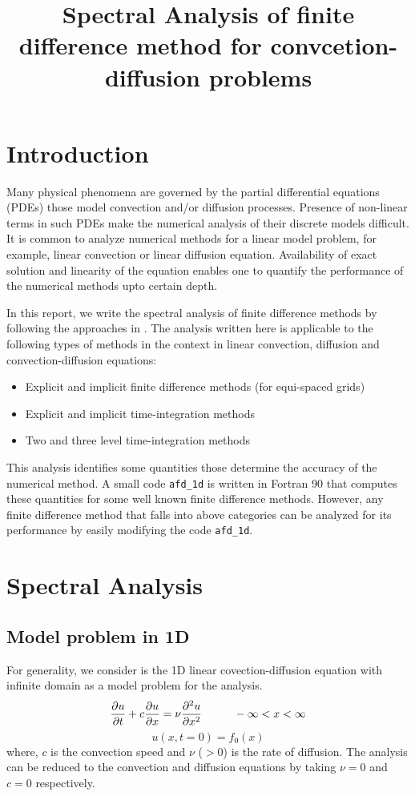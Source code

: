 \documentclass[fleqn]{article}
\title{Spectral Analysis of finite difference method for convcetion-diffusion problems}
\date{}
\begin{document}
\maketitle
\tableofcontents
\newpage

\section{Introduction}
Many physical phenomena are governed by the partial differential equations (PDEs) those model convection and/or diffusion processes. Presence of non-linear terms in such PDEs make the numerical analysis of their discrete models difficult. It is common to analyze numerical methods for a linear model problem, for example, linear convection or linear diffusion equation. Availability of exact solution and linearity of the equation enables one to quantify the performance of the numerical methods upto certain depth.

In this report, we write the spectral analysis of finite difference methods by following the approaches in \cite{TKS_book, CH_book, JCP_2017}. The analysis written here is applicable to the following types of methods in the context in linear convection, diffusion and convection-diffusion equations:
\begin{itemize}
\item Explicit and implicit finite difference methods (for equi-spaced grids)
\item Explicit and implicit time-integration methods
\item Two and three level time-integration methods
\end{itemize}
This analysis identifies some quantities those determine the accuracy of the numerical method. A small code {\tt afd\_1d} is written in Fortran 90 that computes these quantities for some well known finite difference methods. However, any finite difference method that falls into above categories can be analyzed for its performance by easily modifying the code {\tt afd\_1d}.   


\section{Spectral Analysis}
\subsection{Model problem in 1D}
For generality, we consider is the 1D linear covection-diffusion equation with infinite domain as a model problem for the analysis.
\begin{equation}
\frac{\partial u}{\partial t} + c \frac{\partial u}{\partial x} = \nu \frac{\partial^2 u}{\partial x^2} \hspace*{10mm} -\infty < x < \infty \\
\label{1DCD}
\end{equation}
\begin{equation}
u(x, t=0) = f_0(x)
\label{IC}
\end{equation}
where, $c$ is the convection speed and $\nu$ ($> 0$) is the rate of diffusion. The analysis can be reduced to the convection and diffusion equations by taking $\nu = 0$ and $c = 0$ respectively.
\end{document}
